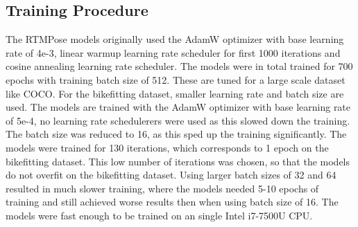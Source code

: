 \subsection{Training Procedure}
The RTMPose models originally used the AdamW \cite{adamw} optimizer with base learning rate of 4e-3, linear warmup learning rate scheduler for first 1000 iterations and cosine annealing learning rate scheduler. The models were in total trained for 700 epochs with training batch size of 512. These are tuned for a large scale dataset like COCO. For the bikefitting dataset, smaller learning rate and batch size are used. The models are trained with the AdamW optimizer with base learning rate of 5e-4, no learning rate schedulerers were used as this slowed down the training. The batch size was reduced to 16, as this sped up the training significantly. The models were trained for 130 iterations, which corresponds to 1 epoch on the bikefitting dataset.
This low number of iterations was chosen, so that the models do not overfit on the bikefitting dataset. Using larger batch sizes of 32 and 64 resulted in much slower training, where the models needed 5-10 epochs of training and still achieved worse results then when using batch size of 16. The models were fast enough to be trained on an single Intel i7-7500U CPU.


